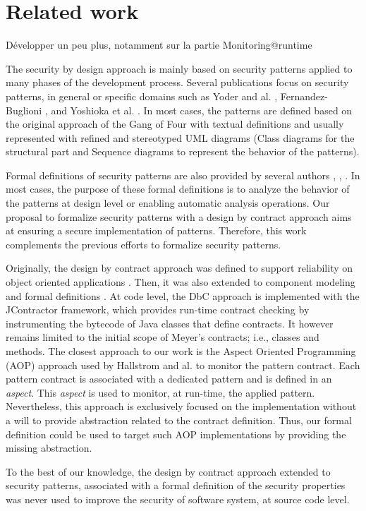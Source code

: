 
\section{Related work}

Développer un peu plus, notamment sur la partie Monitoring@runtime


The security by design approach is mainly based on security patterns applied to many phases of the development process. Several publications focus on security patterns, in general or specific domains such as Yoder and al. \cite{yoder1997}, Fernandez-Buglioni \cite{fernandez2013}, and Yoshioka et al. \cite{yoshioka2008}. In most cases, the patterns are defined based on the original approach of the Gang of Four \cite{gamma1995} with textual definitions and usually represented with refined and stereotyped UML diagrams (Class diagrams for the structural part and Sequence diagrams to represent the behavior of the patterns).

Formal definitions of security patterns are also provided by several authors \cite{cheng2019}, \cite{behrens2018}, \cite{daSilva2013}. In most cases, the purpose of these formal definitions is to analyze the behavior of the patterns at design level or enabling automatic analysis operations. Our proposal to formalize security patterns with a design by contract approach aims at ensuring a secure implementation of patterns. Therefore, this work complements the previous efforts to formalize security patterns.

Originally, the design by contract approach was defined to support reliability on object oriented applications \cite{meyer1992applying}. Then, it was also extended to component modeling \cite{beugnard1999} and formal definitions \cite{mouelhi2019}. 
At code level, the DbC approach is implemented with the JContractor \cite{karaorman2005} framework, which provides run-time contract checking by instrumenting the bytecode of Java classes that define contracts. It however remains limited to the initial scope of Meyer's contracts; i.e., classes and methods. The closest approach to our work is the Aspect Oriented Programming (AOP) approach used by Hallstrom and al. \cite{hallstrom2004} to monitor the pattern contract.
Each pattern contract is associated with a dedicated pattern and is defined in an \emph{aspect}. This \emph{aspect} is used to monitor, at run-time, the applied pattern. Nevertheless, this approach is exclusively focused on the implementation without a will to provide abstraction related to the contract definition. Thus, our formal definition could be used to target such AOP implementations by providing the missing abstraction. 

To the best of our knowledge, the design by contract approach extended to security patterns, associated with a formal definition of the security properties was never used to improve the security of software system, at source code level.




